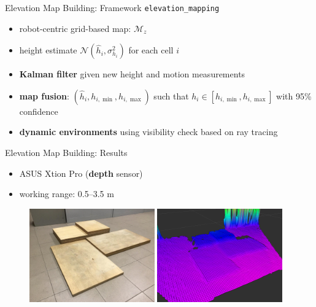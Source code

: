 \documentclass[10pt]{beamer}
\begin{document}
\begin{frame}{Elevation Map Building: Framework}
  \texttt{elevation\_mapping} \cite{Fankhauser2018ProbabilisticTerrainMapping}
  \begin{itemize}
		\item robot-centric grid-based map: $\mathcal{M}_z$
		\item height estimate $\mathcal{N}(\hat{h}_i, \sigma_{h_i}^2)$
				for each cell $i$
		\item \textbf{Kalman filter} given new height and motion measurements
		\item \textbf{map fusion}: $(\hat{h}_i, h_{i,\min}, h_{i,\max})$ such that
				$h_i \in [h_{i,\min}, h_{i,\max}]$ with 95\% confidence
		\item \textbf{dynamic environments} using visibility check based
				on ray tracing
	\end{itemize}
\end{frame}

\begin{frame}{Elevation Map Building: Results}
  \begin{itemize}
		\item ASUS Xtion Pro (\textbf{depth} sensor)
		\item working range: 0.5--3.5 m
  \end{itemize}
  \begin{figure}
    \centering
    \includegraphics[width=0.48\textwidth]{figures/elevmap_pic.jpg}
    \includegraphics[width=0.48\textwidth]{figures/elevmap_rviz.png}
  \end{figure}
\end{frame}
\end{document}
